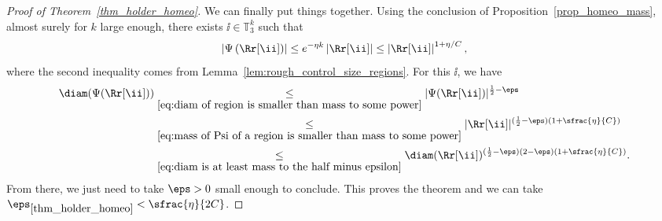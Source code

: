 \begin{proof}[Proof of Theorem~\ref{thm_holder_homeo}]
We can finally put things together.
Using the conclusion of Proposition~\ref{prop_homeo_mass}, almost surely for $k$ large enough, there exists $\ii \in \mathbb{T}_3^k$ such that\vspace*{-3pt}
\begin{equation}
\label{eq:mass of Psi of a region is smaller than mass to some power}
\left| \Psi \left( \Rr[\ii] \right) \right| \leq e^{-\eta k} \left| \Rr[\ii] \right| \leq \left| \Rr[\ii] \right|^{1+\eta/C},
\end{equation}
where the second inequality comes from Lemma~\ref{lem:rough_control_size_regions}.
For this $\ii$, we have\vspace*{-3pt}
\begin{align*}
\diam(\Psi(\Rr[\ii ])) &\underset{\eqref{eq:diam of region is smaller than mass to some power}}{\leq} |\Psi(\Rr[\ii ])|^{\frac{1}{2}-\eps}\\
&\underset{\eqref{eq:mass of Psi of a region is smaller than mass to some power}}{\leq} |\Rr[\ii ]|^{(\frac{1}{2}-\eps)(1+\sfrac{\eta}{C})}\\
&\underset{\eqref{eq:diam is at least mass to the half minus epsilon}}{\leq} \diam(\Rr[\ii ])^{(\frac{1}{2}-\eps)(2-\eps)(1+\sfrac{\eta}{C})}.
\end{align*}
From there, we just need to take $\eps>0$ small enough to conclude. This proves the theorem and we can take $\eps_{\ref{thm_holder_homeo}}<\sfrac{\eta}{2C}$.
\end{proof}

